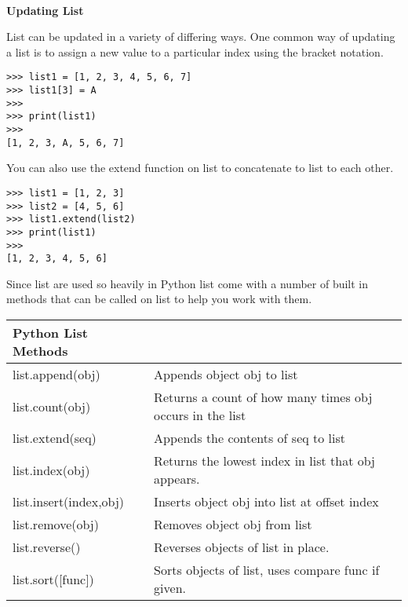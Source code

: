 \documentclass[letterpaper,11pt]{article}
\begin{document}
\\
\textbf{Updating List}
\par{List can be updated in a variety of differing ways. One common way of
    updating a list is to assign a new value to a particular index using the bracket
notation.}
\\
\begin{minipage}{.5\textwidth}
    \begin{tcolorbox}
        \begin{footnotesize}
            \begin{verbatim}
>>> list1 = [1, 2, 3, 4, 5, 6, 7]
>>> list1[3] = A
>>>
>>> print(list1)
>>>
[1, 2, 3, A, 5, 6, 7]
            \end{verbatim}
        \end{footnotesize}
    \end{tcolorbox}
\end{minipage}
\par{You can also use the extend function on list to concatenate to list to each
other.}
\\
\begin{minipage}{.5\textwidth}
    \begin{tcolorbox}
        \begin{footnotesize}
            \begin{verbatim}
>>> list1 = [1, 2, 3]
>>> list2 = [4, 5, 6]
>>> list1.extend(list2)
>>> print(list1)
>>>
[1, 2, 3, 4, 5, 6]
            \end{verbatim}
        \end{footnotesize}
    \end{tcolorbox}
\end{minipage}
\par{Since list are used so heavily in Python list come with a number of built
in methods that can be called on list to help you work with them.}
\\
\begin{tabular}[t]{l l}
    \textbf{Python List Methods}  \\
    \hline
    list.append(obj)       & Appends object obj to list                               \\
    list.count(obj)        & Returns a count of how many times obj occurs in the list \\
    list.extend(seq)       & Appends the contents of seq to list                      \\
    list.index(obj)        & Returns the lowest index in list that obj appears.       \\
    list.insert(index,obj) & Inserts object obj into list at offset index             \\
    list.remove(obj)       & Removes object obj from list                             \\
    list.reverse()         & Reverses objects of list in place.                       \\
    list.sort([func])      & Sorts objects of list, uses compare func if given.       \\
\end{tabular}
\end{document}
